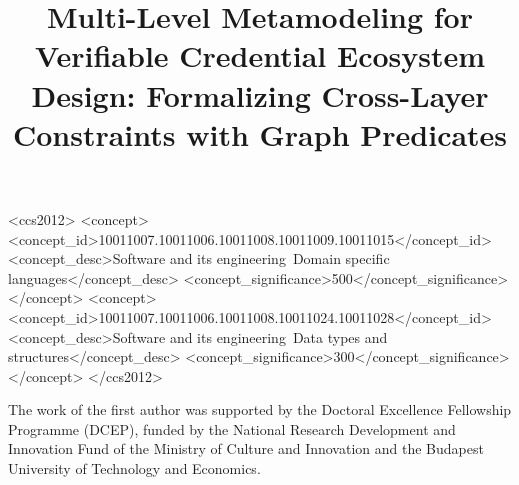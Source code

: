 \documentclass[sigconf,anonymous,review]{acmart}
\begin{document}
\title{Multi-Level Metamodeling for Verifiable Credential Ecosystem Design: Formalizing Cross-Layer Constraints with Graph Predicates}




\begin{CCSXML}
<ccs2012>
 <concept>
  <concept_id>10011007.10011006.10011008.10011009.10011015</concept_id>
  <concept_desc>Software and its engineering~Domain specific languages</concept_desc>
  <concept_significance>500</concept_significance>
 </concept>
 <concept>
  <concept_id>10011007.10011006.10011008.10011024.10011028</concept_id>
  <concept_desc>Software and its engineering~Data types and structures</concept_desc>
  <concept_significance>300</concept_significance>
 </concept>
</ccs2012>
\end{CCSXML}





\maketitle






% 


\begin{acks}
The work of the first author was supported by the Doctoral Excellence
Fellowship Programme (DCEP), funded by the National Research Development
and Innovation Fund of the Ministry of Culture and Innovation and the
Budapest University of Technology and Economics.
\end{acks}





\end{document}
